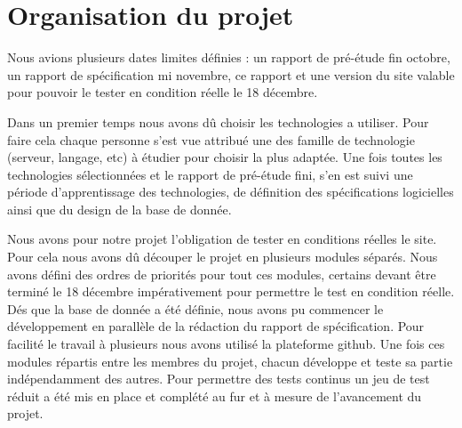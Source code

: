 \chapter{Organisation du projet}

Nous avions plusieurs dates limites définies : un rapport de pré-étude fin octobre, un rapport de spécification mi novembre, ce rapport et une version du site valable pour pouvoir le tester en condition réelle le 18 décembre.

Dans un premier temps nous avons dû choisir les technologies a utiliser. Pour faire cela chaque personne s'est vue attribué une des famille de technologie (serveur, langage, etc) à étudier pour choisir la plus adaptée.
Une fois toutes les technologies sélectionnées et le rapport de pré-étude fini, s'en est suivi une période d'apprentissage des technologies, de définition des spécifications logicielles ainsi que du design de la base de donnée.

Nous avons pour notre projet l'obligation de tester en conditions réelles le site. Pour cela nous avons dû découper le projet en plusieurs modules séparés. Nous avons défini des ordres de priorités pour tout ces modules, certains devant être terminé le 18 décembre impérativement pour permettre le test en condition réelle.
Dés que la base de donnée a été définie, nous avons pu commencer le développement en parallèle de la rédaction du rapport de spécification. Pour facilité le travail à plusieurs nous avons utilisé la plateforme github.
Une fois ces modules répartis entre les membres du projet, chacun développe et teste sa partie indépendamment des autres.
Pour permettre des tests continus un jeu de test réduit a été mis en place et complété au fur et à mesure de l'avancement du projet.
